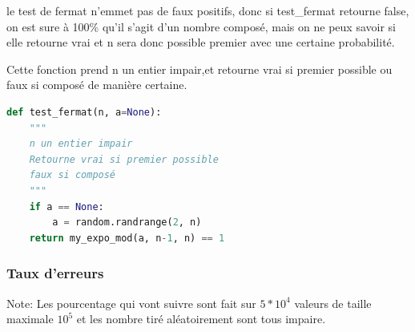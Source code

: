 \documentclass{article}
\begin{document}
le test de fermat n'emmet pas de faux positifs, donc si test\_fermat retourne false, on est sure à 100\% qu'il s'agit d'un nombre composé, mais on ne peux savoir si elle retourne vrai et n sera donc possible premier avec une certaine probabilité.

Cette fonction prend n un entier impair,et retourne vrai si premier possible ou faux si composé de manière certaine.
\begin{lstlisting}[language=Python, caption=test\_fermat]
def test_fermat(n, a=None):
    """
    n un entier impair
    Retourne vrai si premier possible
    faux si composé
    """
    if a == None:
        a = random.randrange(2, n)
    return my_expo_mod(a, n-1, n) == 1
\end{lstlisting}


\subsubsection{Taux d'erreurs}
Note: Les pourcentage qui vont suivre sont fait sur $5 * 10^4$ valeurs de taille maximale $10^5$ et les nombre tiré aléatoirement sont tous impaire.\\
\end{document}
